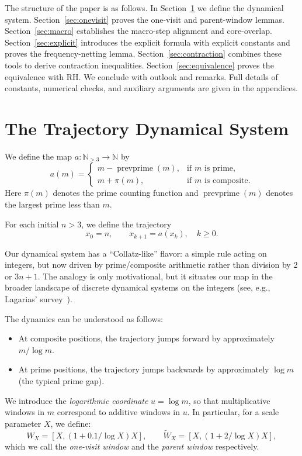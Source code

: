 \documentclass[11pt]{article}
\theoremstyle{plain}
\theoremstyle{definition}
\theoremstyle{remark}
\begin{document}
The structure of the paper is as follows. In Section~\ref{sec:system} we define the dynamical system. Section~\ref{sec:onevisit} proves the one-visit and parent-window lemmas. Section~\ref{sec:macro} establishes the macro-step alignment and core-overlap. Section~\ref{sec:explicit} introduces the explicit formula with explicit constants and proves the frequency-netting lemma. Section~\ref{sec:contraction} combines these tools to derive contraction inequalities. Section~\ref{sec:equivalence} proves the equivalence with RH. We conclude with outlook and remarks. Full details of constants, numerical checks, and auxiliary arguments are given in the appendices.

\section{The Trajectory Dynamical System}\label{sec:system}

We define the map $a:\mathbb{N}_{>3}\to \mathbb{N}$ by
\begin{equation}\label{eq:map}
a(m) =
\begin{cases}
m-\operatorname{prevprime}(m), & \text{if $m$ is prime},\\
m+\pi(m), & \text{if $m$ is composite}.
\end{cases}
\end{equation}
Here $\pi(m)$ denotes the prime counting function and $\operatorname{prevprime}(m)$ denotes the largest prime less than $m$. 

For each initial $n>3$, we define the trajectory
\[
x_0=n,\qquad x_{k+1}=a(x_k), \quad k\ge 0.
\]

Our dynamical system has a “Collatz-like” flavor: a simple rule acting on integers, but now driven by prime/composite arithmetic rather than division by 2 or $3n+1$. The analogy is only motivational, but it situates our map in the broader landscape of discrete dynamical systems on the integers (see, e.g., Lagarias’ survey~\cite{Lagarias2010}).

The dynamics can be understood as follows:
\begin{itemize}
\item At composite positions, the trajectory jumps forward by approximately $m/\log m$.
\item At prime positions, the trajectory jumps backwards by approximately $\log m$ (the typical prime gap).
\end{itemize}

We introduce the \emph{logarithmic coordinate} $u=\log m$, so that multiplicative windows in $m$ correspond to additive windows in $u$. In particular, for a scale parameter $X$, we define:
\[
W_X = [X,(1+0.1/\log X)X], \qquad \widetilde W_X=[X,(1+2/\log X)X],
\]
which we call the \emph{one-visit window} and the \emph{parent window} respectively. 
\end{document}
